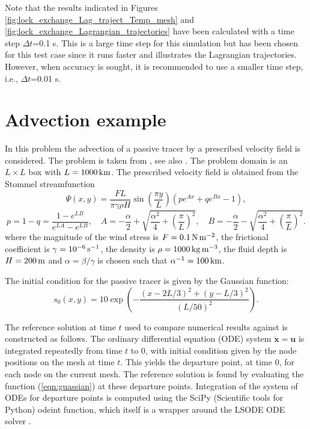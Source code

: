 Note that the results indicated in Figures \ref{fig:lock_exchange_Lag_traject_Temp_mesh} and \ref{fig:lock_exchange_Lagrangian_trajectories} have been calculated with a time step $\Delta t$=0.1 s. This is a large time step for this simulation but has been chosen for this test case since it runs faster and illustrates the Lagrangian trajectories. However, when accuracy is sought, it is recommended to use a smaller time step, i.e., $\Delta t$=0.01 s.


\section{Advection example}
\label{sect:advection}

In this problem the advection of a passive tracer by a prescribed velocity field is considered.
The problem is taken from \cite{hanert2004}, see also \cite{hecht2000}. The problem domain
is an $L\times L$ box with $L=\km[1000]$. The prescribed velocity field is obtained from the
Stommel streamfunction
\begin{equation*}
\Psi(x,y) = \frac{FL}{\pi \gamma \rho H}\sin\left(\frac{\pi y}{L}\right)\left(p e^{Ax} + q e^{Bx}-1\right),
\end{equation*}
\begin{equation*}
p = 1-q = \frac{1-e^{LB}}{e^{LA}-e^{LB}},\quad
A=-\frac{\alpha}{2}+\sqrt{\frac{\alpha^2}{4}+\left(\frac{\pi}{L}\right)^2},\quad
B=-\frac{\alpha}{2}-\sqrt{\frac{\alpha^2}{4}+\left(\frac{\pi}{L}\right)^2}.
\end{equation*}
where the magnitude of the wind stress is $F = \Nmm[0.1]$, the frictional
coefficient is $\gamma = \invs[10^{-6}]$, the density is $\rho = \kgmmm[1000]$, the
fluid depth is $H=\m[200]$ and $\alpha = \beta/\gamma$ is chosen such that $\alpha^{-1}=\km[100]$.

The initial condition for the passive tracer is given by the Gaussian function:
\begin{equation}
s_0(x,y) = 10\exp\left({-\frac{(x-2L/3)^2 + (y-L/3)^2}{(L/50)^2}}\right).
\label{eqn:guassian}
\end{equation}

The reference solution at time $t$ used to compare numerical results against
is constructed as follows.  The ordinary differential equation (ODE) system
$\dot{\pmb{x}}=\pmb{u}$ is integrated repeatedly from time $t$ to $0$, with
initial condition given by the node positions on the mesh at time $t$.  This
yields the departure point, at time $0$, for each node on the current mesh.
The reference solution is found by evaluating the function
(\ref{eqn:guassian}) at these departure points.  Integration of the system
of ODEs for departure points is computed using the SciPy (Scientific tools
for Python) odeint function, which itself is a wrapper around the LSODE ODE
solver \cite{hindmarsh1983}.

